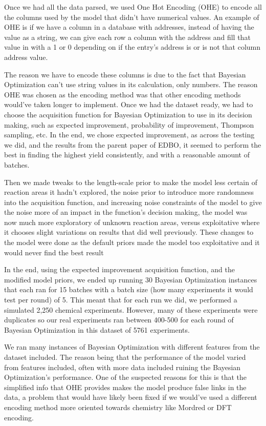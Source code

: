 \documentclass[12pt]{article}
\begin{document}
Once we had all the data parsed, we used One Hot Encoding (OHE) to encode all the columns used by the model that didn’t have numerical values. An example of OHE is if we have a column in a database with addresses, instead of having the value as a string, we can give each row a column with the address and fill that value in with a 1 or 0 depending on if the entry’s address is or is not that column address value.

The reason we have to encode these columns is due to the fact that Bayesian Optimization can’t use string values in its calculation, only numbers. The reason OHE was chosen as the encoding method was that other encoding methods would've taken longer to implement. Once we had the dataset ready, we had to choose the acquisition function for Bayesian Optimization to use in its decision making, such as expected improvement, probability of improvement, Thompson sampling, etc. In the end, we chose expected improvement, as across the testing we did, and the results from the parent paper of EDBO, it seemed to perform the best in finding the highest yield consistently, and with a reasonable amount of batches. 

Then we made tweaks to the length-scale prior to make the model less certain of reaction areas it hadn't explored, the noise prior to introduce more randomness into the acquisition function, and increasing noise constraints of the model to give the noise more of an impact in the function's decision making, the model was now much more exploratory of unknown reaction areas, versus exploitative where it chooses slight variations on results that did well previously. These changes to the model were done as the default priors made the model too exploitative and it would never find the best result

In the end, using the expected improvement acquisition function, and the modified model priors, we ended up running 30 Bayesian Optimization instances that each ran for 15 batches with a batch size (how many experiments it would test per round) of 5. This meant that for each run we did, we performed a simulated 2,250 chemical experiments. However, many of these experiments were duplicates so our real experiments ran between 400-500 for each round of Bayesian Optimization in this dataset of 5761 experiments. 

We ran many instances of Bayesian Optimization with different features from the dataset included. The reason being that the performance of the model varied from features included, often with more data included ruining the Bayesian Optimization’s performance. One of the suspected reasons for this is that the simplified info that OHE provides makes the model produce false links in the data, a problem that would have likely been fixed if we would’ve used a different encoding method more oriented towards chemistry like Mordred or DFT encoding. 
\end{document}

